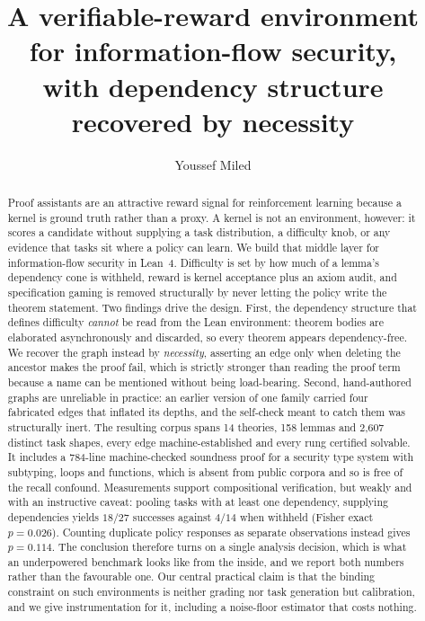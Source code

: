 \documentclass[10pt]{article}
\title{\textbf{A verifiable-reward environment for information-flow security,\\
with dependency structure recovered by necessity}}
\author{Youssef Miled}
\date{}
\begin{document}
\maketitle

\begin{abstract}
\noindent
Proof assistants are an attractive reward signal for reinforcement learning
because a kernel is ground truth rather than a proxy. A kernel is not an
environment, however: it scores a candidate without supplying a task
distribution, a difficulty knob, or any evidence that tasks sit where a policy
can learn. We build that middle layer for information-flow security in Lean~4.
Difficulty is set by how much of a lemma's dependency cone is withheld, reward
is kernel acceptance plus an axiom audit, and specification gaming is removed
structurally by never letting the policy write the theorem statement. Two
findings drive the design. First, the dependency structure that defines
difficulty \emph{cannot} be read from the Lean environment: theorem bodies are
elaborated asynchronously and discarded, so every theorem appears
dependency-free. We recover the graph instead by \emph{necessity}, asserting an
edge only when deleting the ancestor makes the proof fail, which is strictly
stronger than reading the proof term because a name can be mentioned without
being load-bearing. Second, hand-authored graphs are unreliable in practice: an
earlier version of one family carried four fabricated edges that inflated its
depths, and the self-check meant to catch them was structurally inert. The
resulting corpus spans 14 theories, 158 lemmas and 2{,}607 distinct task shapes,
every edge machine-established and every rung certified solvable. It includes a
784-line machine-checked soundness proof for a security type system with
subtyping, loops and functions, which is absent from public corpora and so is
free of the recall confound. Measurements support compositional verification, but weakly and with an
instructive caveat: pooling tasks with at least one dependency, supplying
dependencies yields $18/27$ successes against $4/14$ when withheld (Fisher exact
$p=0.026$). Counting duplicate policy responses as separate observations instead
gives $p=0.114$. The conclusion therefore turns on a single analysis decision,
which is what an underpowered benchmark looks like from the inside, and we
report both numbers rather than the favourable one. Our central practical claim is that the binding
constraint on such environments is neither grading nor task generation but
calibration, and we give instrumentation for it, including a noise-floor
estimator that costs nothing.
\end{abstract}
\end{document}
